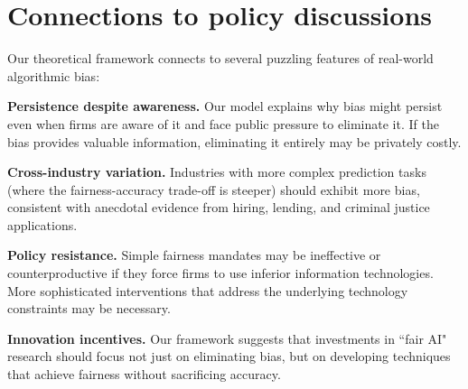 \section{Connections to policy discussions}

Our theoretical framework connects to several puzzling features of real-world algorithmic bias:

\textbf{Persistence despite awareness.} Our model explains why bias might persist even when firms are aware of it and face public pressure to eliminate it. If the bias provides valuable information, eliminating it entirely may be privately costly.

\textbf{Cross-industry variation.} Industries with more complex prediction tasks (where the fairness-accuracy trade-off is steeper) should exhibit more bias, consistent with anecdotal evidence from hiring, lending, and criminal justice applications.

\textbf{Policy resistance.} Simple fairness mandates may be ineffective or counterproductive if they force firms to use inferior information technologies. More sophisticated interventions that address the underlying technology constraints may be necessary.

\textbf{Innovation incentives.} Our framework suggests that investments in ``fair AI" research should focus not just on eliminating bias, but on developing techniques that achieve fairness without sacrificing accuracy.